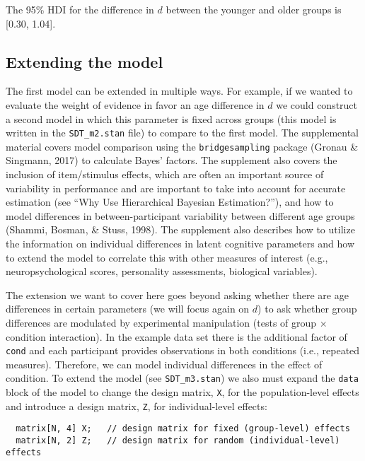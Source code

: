 \documentclass[
  english,
  ,man,floatsintext]{apa6}
\begin{document}
The 95\% HDI for the difference in \(d\) between the younger and older groups is {[}0.30, 1.04{]}.

\hypertarget{extending-the-model}{%
\subsection{Extending the model}\label{extending-the-model}}

The first model can be extended in multiple ways. For example, if we wanted to evaluate the weight of evidence in favor an age difference in \(d\) we could construct a second model in which this parameter is fixed across groups (this model is written in the \texttt{SDT\_m2.stan} file) to compare to the first model. The supplemental material covers model comparison using the \texttt{bridgesampling} package (Gronau \& Singmann, 2017) to calculate Bayes' factors. The supplement also covers the inclusion of item/stimulus effects, which are often an important source of variability in performance and are important to take into account for accurate estimation (see \enquote{Why Use Hierarchical Bayesian Estimation?}), and how to model differences in between-participant variability between different age groups (Shammi, Bosman, \& Stuss, 1998). The supplement also describes how to utilize the information on individual differences in latent cognitive parameters and how to extend the model to correlate this with other measures of interest (e.g., neuropsychological scores, personality assessments, biological variables).

The extension we want to cover here goes beyond asking whether there are age differences in certain parameters (we will focus again on \(d\)) to ask whether group differences are modulated by experimental manipulation (tests of group \(\times\) condition interaction). In the example data set there is the additional factor of \texttt{cond} and each participant provides observations in both conditions (i.e., repeated measures). Therefore, we can model individual differences in the effect of condition. To extend the model (see \texttt{SDT\_m3.stan}) we also must expand the \texttt{data} block of the model to change the design matrix, \texttt{X}, for the population-level effects and introduce a design matrix, \texttt{Z}, for individual-level effects:

\begin{verbatim}
  matrix[N, 4] X;   // design matrix for fixed (group-level) effects
  matrix[N, 2] Z;   // design matrix for random (individual-level) effects
\end{verbatim}
\end{document}

